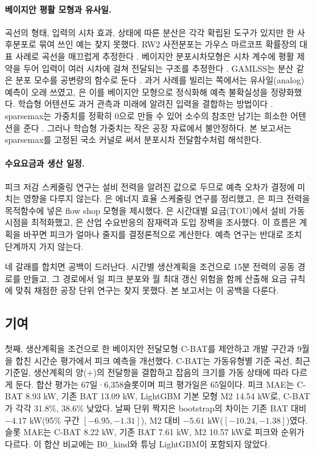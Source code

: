 \paragraph{베이지안 평활 모형과 유사일.} 곡선의 형태, 입력의 시차 효과, 상태에 따른 분산은 각각 확립된 도구가 있지만 한 사후분포로 묶여 쓰인 예는 찾지 못했다. RW2 사전분포는 가우스 마르코프 확률장의 대표 사례로 곡선을 매끄럽게 추정한다 \citep{rue2005gmrf}. 베이지안 분포시차모형은 시차 계수에 평활 제약을 두어 입력이 여러 시차에 걸쳐 전달되는 구조를 추정한다 \citep{welty2009bdlm}. GAMLSS는 분산 같은 분포 모수를 공변량의 함수로 둔다 \citep{rigby2005gamlss}. 과거 사례를 빌리는 쪽에서는 유사일(analog) 예측이 오래 쓰였고, \citet{mcdermott2016analog}은 이를 베이지안 모형으로 정식화해 예측 불확실성을 정량화했다. 학습형 어텐션도 과거 관측과 미래에 알려진 입력을 결합하는 방법이다 \citep{lim2021tft}. sparsemax는 가중치를 정확히 0으로 만들 수 있어 소수의 참조만 남기는 희소한 어텐션을 준다 \citep{martins2016sparsemax}. 그러나 학습형 가중치는 작은 공장 자료에서 불안정하다. 본 보고서는 sparsemax를 고정된 국소 커널로 써서 분포시차 전달함수처럼 해석한다.

\paragraph{수요요금과 생산 일정.} 피크 저감 스케줄링 연구는 설비 전력을 알려진 값으로 두므로 예측 오차가 결정에 미치는 영향을 다루지 않는다. \citet{gahm2016ees}은 에너지 효율 스케줄링 연구를 정리했고, \citet{fang2011peakpower}은 피크 전력을 목적함수에 넣은 flow shop 모형을 제시했다. \citet{shrouf2014tou}은 시간대별 요금(TOU)에서 설비 가동 시점을 최적화했고, \citet{shoreh2016dr}은 산업 수요반응의 잠재력과 도입 장벽을 조사했다. 이 흐름은 계획을 바꾸면 피크가 얼마나 줄지를 결정론적으로 계산한다. 예측 연구는 반대로 조치 단계까지 가지 않는다.

네 갈래를 합치면 공백이 드러난다. 시간별 생산계획을 조건으로 15분 전력의 공동 경로를 만들고, 그 경로에서 일 피크 분포와 월 최대 갱신 위험을 함께 산출해 요금 규칙에 맞춰 채점한 공장 단위 연구는 찾지 못했다. 본 보고서는 이 공백을 다룬다.

\subsection{기여}

첫째, 생산계획을 조건으로 한 베이지안 전달모형 C-BAT를 제안하고 개발 구간과 9월을 합친 시간순 평가에서 피크 예측을 개선했다. C-BAT는 가동유형별 기준 곡선, 최근 기준일, 생산계획의 양(+)의 전달항을 결합하고 잡음의 크기를 가동 상태에 따라 다르게 둔다. 합산 평가는 67일·6,358슬롯이며 피크 평가일은 65일이다. 피크 MAE는 C-BAT 8.93 kW, 기존 BAT 13.09 kW, LightGBM 기본 모형 M2 14.54 kW로, C-BAT가 각각 31.8\%, 38.6\% 낮았다. 날짜 단위 짝지은 bootstrap의 차이는 기존 BAT 대비 $-4.17$ kW(95\% 구간 $[-6.95,-1.31]$), M2 대비 $-5.61$ kW($[-10.24,-1.38]$)였다. 슬롯 MAE는 C-BAT 8.22 kW, 기존 BAT 7.61 kW, M2 10.57 kW로 피크와 순위가 다르다. 이 합산 비교에는 B0\_kind와 튜닝 LightGBM이 포함되지 않았다.

